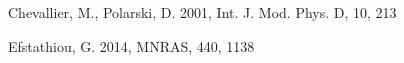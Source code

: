 \documentclass[iop]{emulateapj}
\begin{document}
\begin{thebibliography}{}




Chevallier, M., Polarski, D. 2001, Int. J. Mod. Phys. D, 10, 213











Efstathiou, G. 2014, MNRAS, 440, 1138





\end{thebibliography}
\end{document}
